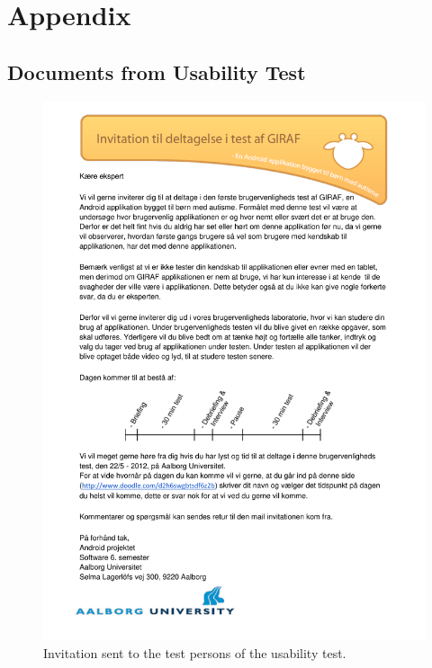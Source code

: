\chapter*{Appendix}

\section{Documents from Usability Test}
\label{app:usability_documents}
	\begin{figure}[H]
		\begin{center}
			\includegraphics[width=\textwidth]{Appendix/invitation_to_usability_test.pdf}
		\end{center}
		\caption{Invitation sent to the test persons of the usability test.}
		\label{appendice:usability_test}
	\end{figure}
	
